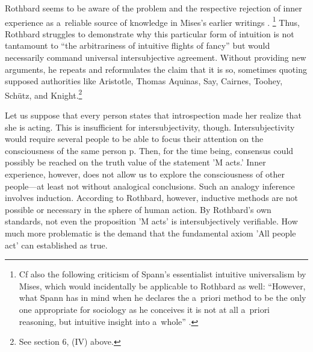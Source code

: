 Rothbard seems to be aware of the problem and the respective rejection of inner experience as a~reliable source of knowledge in Mises's earlier writings 
\parencite[e.g.][pp.17–19]{mises_nationalokonomie_1940}.%
\footnote{Cf also the following criticism of Spann's essentialist intuitive universalism by Mises, which would incidentally be applicable to Rothbard as well: ``However, what Spann has in mind when he declares the a~priori method to be the only one appropriate for sociology as he conceives it is not at all a~priori reasoning, but intuitive insight into a~whole'' 
\parencite[][p.46]{mises_epistemological_2003}.%
} Thus, Rothbard struggles to demonstrate why this particular form of intuition is not tantamount to ``the arbitrariness of intuitive flights of fancy'' 
\parencite[][p.52]{mises_epistemological_2003} %
 but would necessarily command universal intersubjective agreement. Without providing new arguments, he repeats and reformulates the claim that it is so, sometimes quoting supposed authorities like Aristotle, Thomas Aquinas, Say, Cairnes, Toohey, Schütz, and Knight.\footnote{See section 6, (IV) above.}



Let us suppose that every person states that introspection made her realize that she is acting. This is insufficient for intersubjectivity, though. Intersubjectivity would require several people to be able to focus their attention on the consciousness of the same person p. Then, for the time being, consensus could possibly be reached on the truth value of the statement 'M acts.' Inner experience, however, does not allow us to explore the consciousness of other people---at least not without analogical conclusions. Such an analogy inference involves induction. According to Rothbard, however, inductive methods are not possible or necessary in the sphere of human action. By Rothbard's own standards, not even the proposition 'M acts' is intersubjectively verifiable. How much more problematic is the demand that the fundamental axiom 'All people act' can established as true.



